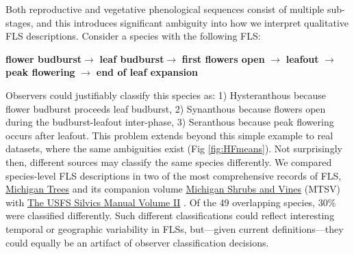\documentclass{article}
\begin{document}
\noindent Both reproductive and vegetative phenological sequences consist of multiple sub-stages, and this introduces significant ambiguity into how we interpret qualitative FLS descriptions. Consider a species with the following FLS:\\

\begin{center}
\textbf{flower budburst}$\rightarrow$ \textbf{leaf budburst}$\rightarrow$ \textbf{first flowers open} $\rightarrow$ \textbf{leafout} $\rightarrow$ \textbf{peak flowering} $\rightarrow$ \textbf{end of leaf expansion} \\
\end{center}

\noindent Observers could justifiably classify this species as: 1) Hysteranthous because flower budburst proceeds leaf budburst, 2) Synanthous because flowers open during the budburst-leafout inter-phase, 3) Seranthous because peak flowering occurs after leafout. This problem extends beyond this simple example to real datasets, \citep[e.g.][]{OKeefe2015} where the same ambiguities exist (Fig \ref{fig:HFmeans}). Not surprisingly then, different sources may classify the same species differently. We compared species-level FLS descriptions in two of the most comprehensive records of FLS, \underline{Michigan Trees} and its companion volume \underline{Michigan Shrubs and Vines} (MTSV) \citep{Barnes2004,Barnes2016} with \underline{The USFS Silvics Manual Volume II} \citep{Burns1990}. Of the 49 overlapping species, 30\% were classified differently. Such different classifications could reflect interesting temporal or geographic variability in FLSs, but---given current definitions---they could equally be an artifact of observer classification decisions.\\
\end{document}
